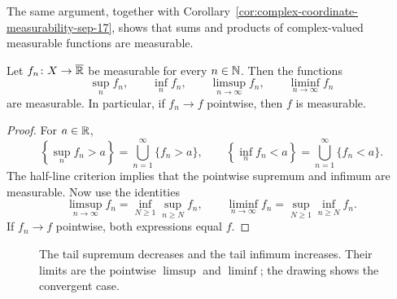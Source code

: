 The same argument, together with
Corollary~\ref{cor:complex-coordinate-measurability-sep-17}, shows that
sums and products of complex-valued measurable functions are measurable.

\begin{proposition}
  \label{prop:measurable-sequential-operations-sep-17}
  Let $f_n\colon X\to\overline{\mathbb{R}}$ be measurable for every
  $n\in\mathbb{N}$.  Then the functions
  \[
    \sup_n f_n,\qquad \inf_n f_n,\qquad
    \limsup_{n\to\infty}f_n,
    \qquad \liminf_{n\to\infty}f_n
  \]
  are measurable.  In particular, if $f_n\to f$ pointwise, then $f$ is
  measurable.
\end{proposition}

\begin{proof}
  For $a\in\mathbb{R}$,
  \[
    \left\{\sup_n f_n>a\right\}
      =\bigcup_{n=1}^{\infty}\{f_n>a\},
    \qquad
    \left\{\inf_n f_n<a\right\}
      =\bigcup_{n=1}^{\infty}\{f_n<a\}.
  \]
  The half-line criterion implies that the pointwise supremum and
  infimum are measurable.  Now use the identities
  \[
    \limsup_{n\to\infty}f_n
      =\inf_{N\geq1}\sup_{n\geq N}f_n,
    \qquad
    \liminf_{n\to\infty}f_n
      =\sup_{N\geq1}\inf_{n\geq N}f_n.
  \]
  If $f_n\to f$ pointwise, both expressions equal $f$.
\end{proof}

\begin{figure}[htbp]
  \centering
  \caption{The tail supremum decreases and the tail infimum increases.
    Their limits are the pointwise $\limsup$ and $\liminf$; the drawing
    shows the convergent case.}
  \label{fig:limsup-liminf-sep-17}
\end{figure}

